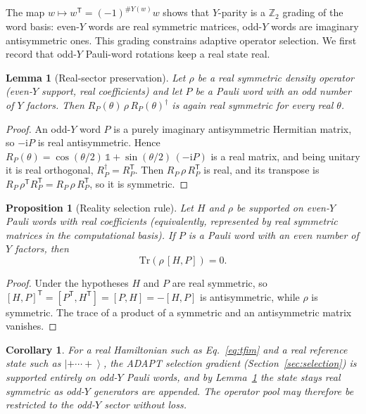 \documentclass[11pt]{article}
\newcommand{\Tr}{\mathrm{Tr}}
\newcommand{\ii}{\mathrm{i}}
\newcommand{\ket}[1]{\left|#1\right\rangle}
\newtheorem{proposition}{Proposition}
\newtheorem{lemma}{Lemma}
\newtheorem{corollary}{Corollary}
\begin{document}
The map $w\mapsto w^{\mathsf T}=(-1)^{\#Y(w)}w$ shows that $Y$-parity is a $\mathbb{Z}_2$ grading of the word basis: even-$Y$ words are real symmetric matrices, odd-$Y$ words are imaginary antisymmetric ones.  This grading constrains adaptive operator selection.  We first record that odd-$Y$ Pauli-word rotations keep a real state real.

\begin{lemma}[Real-sector preservation]
\label{lem:realsector}
Let $\rho$ be a real symmetric density operator (even-$Y$ support, real coefficients) and let $P$ be a Pauli word with an odd number of $Y$ factors.  Then $R_P(\theta)\,\rho\,R_P(\theta)^\dagger$ is again real symmetric for every real $\theta$.
\end{lemma}

\begin{proof}
An odd-$Y$ word $P$ is a purely imaginary antisymmetric Hermitian matrix, so $-\ii P$ is real antisymmetric.  Hence
$R_P(\theta)=\cos(\theta/2)\,\mathbb{1}+\sin(\theta/2)\,(-\ii P)$
is a real matrix, and being unitary it is real orthogonal, $R_P^\dagger=R_P^{\mathsf T}$.  Then $R_P\,\rho\,R_P^{\mathsf T}$ is real, and its transpose is $R_P\,\rho^{\mathsf T}R_P^{\mathsf T}=R_P\,\rho\,R_P^{\mathsf T}$, so it is symmetric.
\end{proof}

\begin{proposition}[Reality selection rule]
\label{prop:parity}
Let $H$ and $\rho$ be supported on even-$Y$ Pauli words with real coefficients (equivalently, represented by real symmetric matrices in the computational basis).  If $P$ is a Pauli word with an even number of $Y$ factors, then
\begin{equation}
    \Tr\!\left(\rho\,[H,P]\right)=0 .
\end{equation}
\end{proposition}

\begin{proof}
Under the hypotheses $H$ and $P$ are real symmetric, so $[H,P]^{\mathsf T}=[P^{\mathsf T},H^{\mathsf T}]=[P,H]=-[H,P]$ is antisymmetric, while $\rho$ is symmetric.  The trace of a product of a symmetric and an antisymmetric matrix vanishes.
\end{proof}

\begin{corollary}
For a real Hamiltonian such as Eq.~\eqref{eq:tfim} and a real reference state such as $\ket{+\cdots+}$, the ADAPT selection gradient (Section~\ref{sec:selection}) is supported entirely on odd-$Y$ Pauli words, and by Lemma~\ref{lem:realsector} the state stays real symmetric as odd-$Y$ generators are appended.  The operator pool may therefore be restricted to the odd-$Y$ sector without loss.
\end{corollary}
\end{document}
